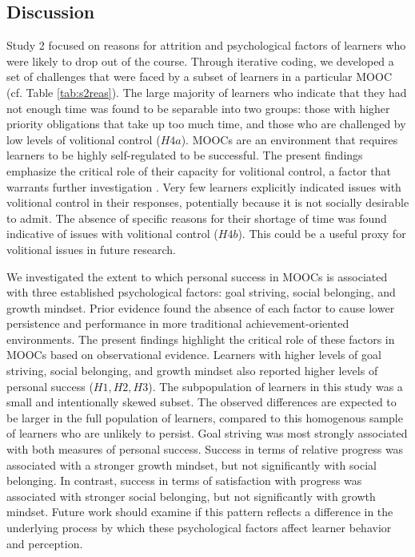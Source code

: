 \documentclass{sigchi}\usepackage[]{graphicx}\usepackage[]{color}
\begin{document}
\subsection{Discussion}

Study 2 focused on reasons for attrition and psychological factors of learners who were likely to drop out of the course. Through iterative coding, we developed a set of challenges that were faced by a subset of learners in a particular MOOC (cf. Table \ref{tab:s2reas}). The large majority of learners who indicate that they had not enough time was found to be separable into two groups: those with higher priority obligations that take up too much time, and those who are challenged by low levels of volitional control ($H4a$). MOOCs are an environment that requires learners to be highly self-regulated to be successful. The present findings emphasize the critical role of their capacity for volitional control, a factor that warrants further investigation \cite{corno2001volitional}. Very few learners explicitly indicated issues with volitional control in their responses, potentially because it is not socially desirable to admit. The absence of specific reasons for their shortage of time was found indicative of issues with volitional control ($H4b$). This could be a useful proxy for volitional issues in future research.

We investigated the extent to which personal success in MOOCs is associated with three established psychological factors: goal striving, social belonging, and growth mindset. Prior evidence found the absence of each factor to cause lower persistence and performance in more traditional achievement-oriented environments. The present findings highlight the critical role of these factors in MOOCs based on observational evidence. Learners with higher levels of goal striving, social belonging, and growth mindset also reported higher levels of personal success ($H1,H2,H3$). The subpopulation of learners in this study was a small and intentionally skewed subset. The observed differences are expected to be larger in the full population of learners, compared to this homogenous sample of learners who are unlikely to persist. Goal striving was most strongly associated with both measures of personal success. Success in terms of relative progress was associated with a stronger growth mindset, but not significantly with social belonging. In contrast, success in terms of satisfaction with progress was associated with stronger social belonging, but not significantly with growth mindset. Future work should examine if this pattern reflects a difference in the underlying process by which these psychological factors affect learner behavior and perception.
\end{document}
